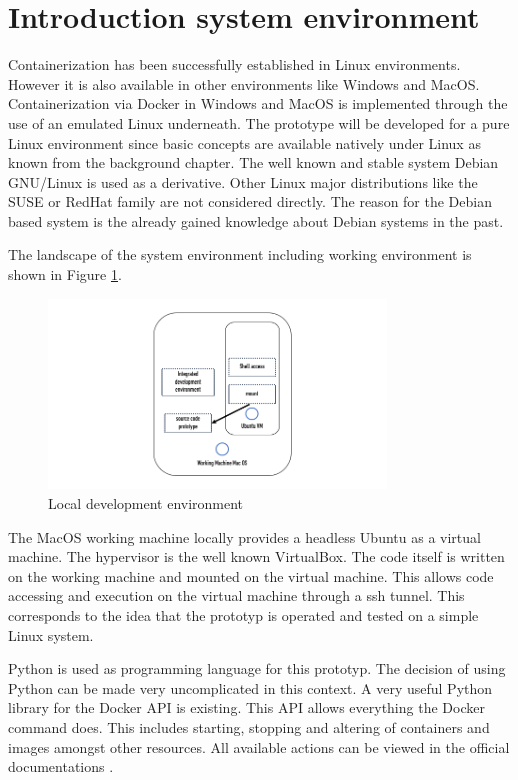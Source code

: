 \section{Introduction system environment}
\label{ch:practical_realization:sys_env}

Containerization has been successfully established in Linux environments.
However it is also available in other environments like Windows and MacOS.
Containerization via Docker in Windows and MacOS is implemented through the use of an emulated Linux underneath.
The prototype will be developed for a pure Linux environment since basic concepts are available natively under Linux as known from the background chapter.
The well known and stable system Debian GNU/Linux is used as a derivative. 
Other Linux major distributions like the SUSE or RedHat family are not considered directly. 
The reason for the Debian based system is the already gained knowledge about Debian systems in the past. 

The landscape of the system environment including working environment is shown in Figure \ref{fig:pract:sys_env}.
\begin{figure}[h!]
 \centering
 \includegraphics[width=0.8\textwidth]{gfx/examples/sys_env.png}
 \caption{Local development environment}
 \label{fig:pract:sys_env}
\end{figure}
The MacOS working machine locally provides a headless Ubuntu as a virtual machine. 
The hypervisor is the well known VirtualBox.
The code itself is written on the working machine and mounted on the virtual machine. 
This allows code accessing and execution on the virtual machine through a ssh tunnel. 
This corresponds to the idea that the prototyp is operated and tested on a simple Linux system.

Python is used as programming language for this prototyp. 
The decision of using Python can be made very uncomplicated in this context. 
A very useful Python library for the Docker API is existing. 
This API allows everything the Docker command does. 
This includes starting, stopping and altering of containers and images amongst other resources. 
All available actions can be viewed in the official documentations \cite{python_sdk}. 

